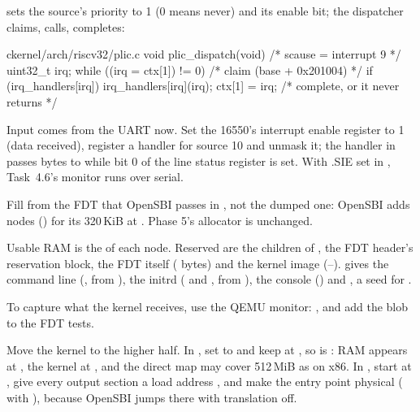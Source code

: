 \documentclass[11pt,a4paper]{article}
\begin{document}
 sets the source's priority to 1 (0 means never) and its enable bit; the dispatcher
claims, calls, completes:

\begin{lst}{c}{kernel/arch/riscv32/plic.c}
void plic_dispatch(void)                            /* scause = interrupt 9           */
{
    uint32_t irq;
    while ((irq = ctx[1]) != 0) {                   /* claim (base + 0x201004)        */
        if (irq_handlers[irq])
            irq_handlers[irq](irq);
        ctx[1] = irq;                               /* complete, or it never returns  */
    }
}
\end{lst}

Input comes from the UART now. Set the 16550's interrupt enable register to 1 (data received), register a handler
for source 10 and unmask it; the handler in  passes bytes to  while bit 0 of
the line status register is set. With .SIE set in , Task~4.6's monitor runs over serial.

Fill  from the FDT that OpenSBI passes in , not the dumped one: OpenSBI adds
 nodes () for its 320\,KiB at . Phase 5's allocator is unchanged.

Usable RAM is the  of each  node. Reserved are the children of ,
the FDT header's reservation block, the FDT itself ( bytes) and the kernel image
(--).  gives the command line (, from
), the initrd ( and , from ), the console
() and , a seed for .

To capture what the kernel receives, use the QEMU monitor: , and add
the blob to the FDT tests.

Move the kernel to the higher half. In , set  to  and keep  at
, so  is : RAM appears at , the
kernel at , and the direct map may cover 512\,MiB as on x86. In , start at
, give every output section a load address , and make the entry point
physical ( with ), because OpenSBI jumps there with
translation off.
\end{document}
